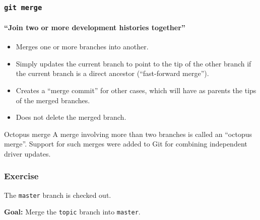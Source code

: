 \documentclass{beamer}
\newcommand\gitcmd[1]{\texttt{git #1}}
\newcommand\gbranch[1]{\texttt{#1}}
\newcommand\goal[1]{\textbf{Goal:} #1}
\begin{document}
\begin{frame}
  \frametitle{\gitcmd{merge}}
  \framesubtitle{``Join two or more development histories together''}
  \begin{itemize}
    \item Merges one or more branches into another.
    \item Simply updates the current branch to point to the tip of the other branch if the current branch is a direct ancestor (``fast-forward merge'').
    \item Creates a ``merge commit'' for other cases, which will have as parents the tips of the merged branches.
    \item Does not delete the merged branch.
  \end{itemize}
  \begin{block}{Octopus merge}
    A merge involving more than two branches is called an ``octopus merge''.
    Support for such merges were added to Git for combining independent driver updates.
  \end{block}
\end{frame}

\begin{frame}
  \frametitle{Exercise}

  The \gbranch{master} branch is checked out.

  \goal{Merge the \gbranch{topic} branch into \gbranch{master}.}
  
  \begin{figure}
    \centering
  \end{figure}
\end{frame}
\end{document}
